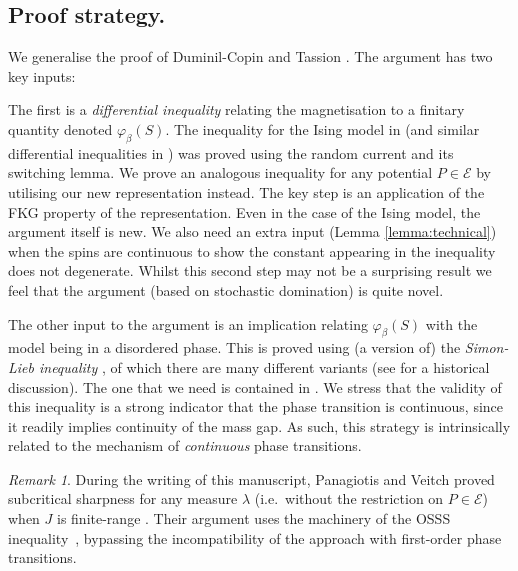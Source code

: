 \documentclass{article}
\numberwithin{equation}{section}
\theoremstyle{definition}
\theoremstyle{definition}
\theoremstyle{remark}
\newtheorem{remark}{Remark}
\newcommand\vp{\varphi}
\newcommand\Ec{\mathcal{E}}
\renewcommand{\l}{\lambda}
\begin{document}
\subsection{Proof strategy. }We generalise the proof of Duminil-Copin and Tassion \cite{DCT}. The argument has two key inputs:

The first is a \emph{differential inequality} relating the magnetisation to a finitary quantity denoted $\vp_\beta(S)$. 
The inequality for the Ising model in \cite{DCT} (and similar differential inequalities in \cite{ABF}) was proved using the random current and its switching lemma. 
We prove an analogous inequality for any potential $P \in \Ec$ by utilising our new representation instead. The key step is an application of the FKG property of the representation. Even in the case of the Ising model, the argument itself is new. We also need an extra input (Lemma \ref{lemma:technical}) when the spins are continuous to show the constant appearing in the inequality does not degenerate. Whilst this second step may not be a surprising result we feel that the argument (based on stochastic domination) is quite novel.

The other input to the argument is an implication relating $\vp_\beta(S)$ with the model being in a disordered phase. This is proved using (a version of) the \emph{Simon-Lieb inequality} \cite{simon1980correlation,Lieb}, of which there are many different variants (see \cite{simon2026phase} for a historical discussion). 
The one that we need is contained in \cite{BFS,brydges1983random}. 
We stress that the validity of this inequality is a strong indicator that the phase transition is continuous, since it readily implies continuity of the mass gap. As such, this strategy is intrinsically related to the mechanism of \emph{continuous} phase transitions. 

\begin{remark}\label{remark:panagiotis}
	During the writing of this manuscript, Panagiotis and Veitch proved subcritical sharpness for any measure $\l$ (i.e.~without the restriction on $P \in \Ec$) when $J$ is finite-range \cite{panagiotis2026subcritical}. Their argument uses the machinery of the OSSS inequality~\cite{duminil2019sharp}, bypassing the incompatibility of the \cite{DCT} approach with first-order phase transitions. 
\end{remark}


\end{document}

